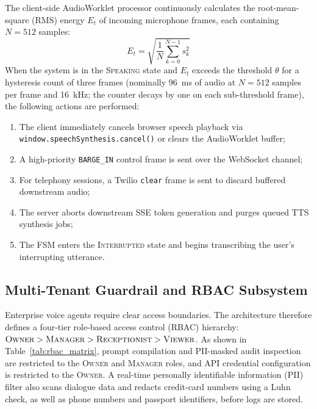 \documentclass[review,12pt,times,authoryear]{elsarticle}
\theoremstyle{definition}
\begin{document}
The client-side AudioWorklet processor continuously calculates the root-mean-square (RMS) energy $E_t$ of incoming microphone frames, each containing $N = 512$ samples:
\begin{equation}
  E_t = \sqrt{\frac{1}{N} \sum_{k=0}^{N-1} s_k^2}
\end{equation}
When the system is in the \textsc{Speaking} state and $E_t$ exceeds the threshold $\theta$ for a hysteresis count of three frames (nominally \SI{96}{\milli\second} of audio at $N=512$ samples per frame and \SI{16}{\kilo\hertz}; the counter decays by one on each sub-threshold frame), the following actions are performed:
\begin{enumerate}[noitemsep]
  \item The client immediately cancels browser speech playback via \texttt{window.\allowbreak speechSynthesis.\allowbreak cancel()} or clears the AudioWorklet buffer;
  \item A high-priority \texttt{BARGE\_IN} control frame is sent over the WebSocket channel;
  \item For telephony sessions, a Twilio \texttt{clear} frame is sent to discard buffered downstream audio;
  \item The server aborts downstream SSE token generation and purges queued TTS synthesis jobs;
  \item The FSM enters the \textsc{Interrupted} state and begins transcribing the user's interrupting utterance.
\end{enumerate}

\subsection{Multi-Tenant Guardrail and RBAC Subsystem}
Enterprise voice agents require clear access boundaries. The architecture therefore defines a four-tier role-based access control (RBAC) hierarchy: $\textsc{Owner} > \textsc{Manager} > \textsc{Receptionist} > \textsc{Viewer}$. As shown in Table~\ref{tab:rbac_matrix}, prompt compilation and PII-masked audit inspection are restricted to the \textsc{Owner} and \textsc{Manager} roles, and API credential configuration is restricted to the \textsc{Owner}. A real-time personally identifiable information (PII) filter also scans dialogue data and redacts credit-card numbers using a Luhn check, as well as phone numbers and passport identifiers, before logs are stored.
\end{document}
